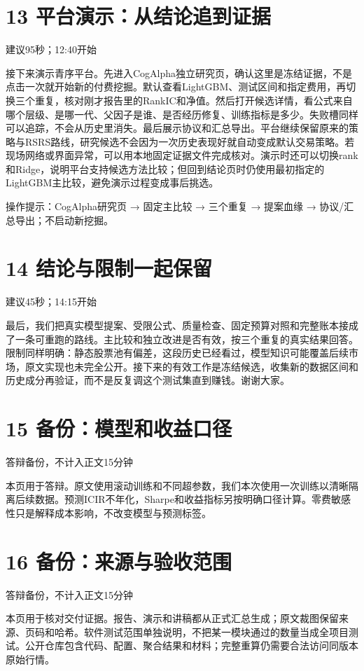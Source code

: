 \documentclass[UTF8,a4paper,11pt]{ctexart}
\begin{document}
\section*{\color{ink}13 平台演示：从结论追到证据}
{\small\color{accent}建议95秒；12:40开始}\par
接下来演示青序平台。先进入CogAlpha独立研究页，确认这里是冻结证据，不是点击一次就开始新的付费挖掘。默认查看LightGBM、测试区间和指定费用，再切换三个重复，核对刚才报告里的RankIC和净值。然后打开候选详情，看公式来自哪个层级、是哪一代、父因子是谁、是否经历修复、训练指标是多少。失败槽同样可以追踪，不会从历史里消失。最后展示协议和汇总导出。平台继续保留原来的策略与RSRS路线，研究候选不会因为一次历史表现好就自动变成默认交易策略。若现场网络或界面异常，可以用本地固定证据文件完成核对。演示时还可以切换rank和Ridge，说明平台支持候选方法比较；但回到结论页时仍使用最初指定的LightGBM主比较，避免演示过程变成事后挑选。
\par{\small\color{accent}操作提示：CogAlpha研究页 → 固定主比较 → 三个重复 → 提案血缘 → 协议/汇总导出；不启动新挖掘。}
\section*{\color{ink}14 结论与限制一起保留}
{\small\color{accent}建议45秒；14:15开始}\par
最后，我们把真实模型提案、受限公式、质量检查、固定预算对照和完整账本接成了一条可重跑的路线。主比较和独立改进是否有效，按三个重复的真实结果回答。限制同样明确：静态股票池有偏差，这段历史已经看过，模型知识可能覆盖后续市场，原文实现也未完全公开。接下来的有效工作是冻结候选，收集新的数据区间和历史成分再验证，而不是反复调这个测试集直到赚钱。谢谢大家。
\newpage
\section*{\color{ink}15 备份：模型和收益口径}
{\small\color{accent}答辩备份，不计入正文15分钟}\par
本页用于答辩。原文使用滚动训练和不同超参数，我们本次使用一次训练以清晰隔离后续数据。预测ICIR不年化，Sharpe和收益指标另按明确口径计算。零费敏感性只是解释成本影响，不改变模型与预测标签。
\section*{\color{ink}16 备份：来源与验收范围}
{\small\color{accent}答辩备份，不计入正文15分钟}\par
本页用于核对交付证据。报告、演示和讲稿都从正式汇总生成；原文裁图保留来源、页码和哈希。软件测试范围单独说明，不把某一模块通过的数量当成全项目测试。公开仓库包含代码、配置、聚合结果和材料；完整重算仍需要合法访问同版本原始行情。
\end{document}
